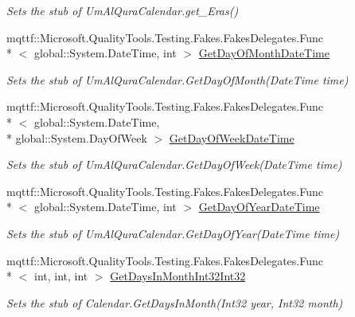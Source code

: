 \begin{DoxyCompactItemize}
\begin{DoxyCompactList}\small\item\em Sets the stub of Um\-Al\-Qura\-Calendar.\-get\-\_\-\-Eras()\end{DoxyCompactList}\item 
mqttf\-::\-Microsoft.\-Quality\-Tools.\-Testing.\-Fakes.\-Fakes\-Delegates.\-Func\\*
$<$ global\-::\-System.\-Date\-Time, int $>$ \hyperlink{class_system_1_1_globalization_1_1_fakes_1_1_stub_um_al_qura_calendar_a9e4de8aa01a58d7d57713df4ed8d2d14}{Get\-Day\-Of\-Month\-Date\-Time}
\begin{DoxyCompactList}\small\item\em Sets the stub of Um\-Al\-Qura\-Calendar.\-Get\-Day\-Of\-Month(\-Date\-Time time)\end{DoxyCompactList}\item 
mqttf\-::\-Microsoft.\-Quality\-Tools.\-Testing.\-Fakes.\-Fakes\-Delegates.\-Func\\*
$<$ global\-::\-System.\-Date\-Time, \\*
global\-::\-System.\-Day\-Of\-Week $>$ \hyperlink{class_system_1_1_globalization_1_1_fakes_1_1_stub_um_al_qura_calendar_a90167404bb64f14f6ad5e8902d9ea464}{Get\-Day\-Of\-Week\-Date\-Time}
\begin{DoxyCompactList}\small\item\em Sets the stub of Um\-Al\-Qura\-Calendar.\-Get\-Day\-Of\-Week(\-Date\-Time time)\end{DoxyCompactList}\item 
mqttf\-::\-Microsoft.\-Quality\-Tools.\-Testing.\-Fakes.\-Fakes\-Delegates.\-Func\\*
$<$ global\-::\-System.\-Date\-Time, int $>$ \hyperlink{class_system_1_1_globalization_1_1_fakes_1_1_stub_um_al_qura_calendar_ad074e0e4bb5672ace5626250751951f6}{Get\-Day\-Of\-Year\-Date\-Time}
\begin{DoxyCompactList}\small\item\em Sets the stub of Um\-Al\-Qura\-Calendar.\-Get\-Day\-Of\-Year(\-Date\-Time time)\end{DoxyCompactList}\item 
mqttf\-::\-Microsoft.\-Quality\-Tools.\-Testing.\-Fakes.\-Fakes\-Delegates.\-Func\\*
$<$ int, int, int $>$ \hyperlink{class_system_1_1_globalization_1_1_fakes_1_1_stub_um_al_qura_calendar_aa173f61f7caf646bc0509d8f8f336439}{Get\-Days\-In\-Month\-Int32\-Int32}
\begin{DoxyCompactList}\small\item\em Sets the stub of Calendar.\-Get\-Days\-In\-Month(\-Int32 year, Int32 month)\end{DoxyCompactList}\item 

\end{DoxyCompactItemize}
